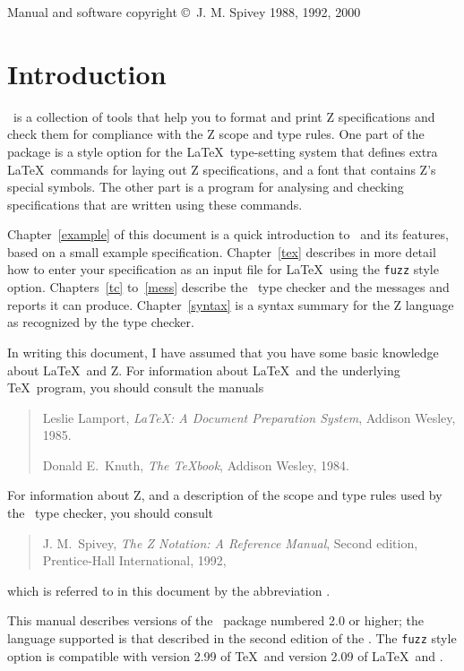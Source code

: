 \tableofcontents

\vfill
\noindent Manual and software copyright \copyright\
J. M. Spivey 1988, 1992, 2000
\clearpage
\thispagestyle{empty}
\cleardoublepage

\chapter{Introduction}

\fuzz\ is a collection of tools that help you to format and print Z
specifications and check them for compliance with the Z scope and
type rules. One part of the package is a style option for the
\LaTeX\ type-setting system that defines extra \LaTeX\ commands for
laying out Z specifications, and a font that contains Z's special
symbols.  The other part is a program for analysing and checking
specifications that are written using these commands.

Chapter~\ref{example} of this document is a quick introduction to
\fuzz\ and its features, based on a small example specification.
Chapter~\ref{tex} describes in more detail how to enter your
specification as an input file for \LaTeX\ using the {\tt fuzz} style
option.  Chapters~\ref{tc} to~\ref{mess} describe the \fuzz\
type checker and the messages and reports it can produce.
Chapter~\ref{syntax} is a syntax summary for the Z language as
recognized by the type checker.

In writing this document, I have assumed that you have some basic
knowledge about \LaTeX\ and Z. For information about \LaTeX\ and the
underlying \TeX\ program, you should consult the manuals
\begin{quote}
        Leslie Lamport, {\em \LaTeX{\rm :} A Document Preparation
        System\/},\break
        Addison Wesley, 1985.

        Donald E.~Knuth, {\em The \TeX book}, Addison Wesley, 1984.
\end{quote}
For information about Z, and a description of the scope and type rules
used by the \fuzz\ type checker, you should consult
\begin{quote}
        J. M.~Spivey, {\em The Z Notation: A Reference Manual\/},
        Second edition, Prentice-Hall International, 1992,
\end{quote}
which is referred to in this document by the abbreviation \ZRM.

This manual describes versions of the \fuzz\ package numbered 2.0
or higher; the language supported is that described in the second
edition of the \ZRM.
The \verb/fuzz/ style option is compatible with version
2.99 of \TeX\ and version 2.09 of \LaTeX\ and \SliTeX.

